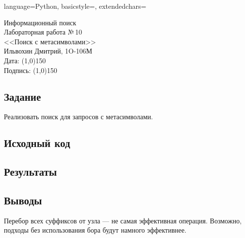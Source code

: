 \documentclass[12pt]{article}
\newcommand{\StudentName}{Ильвохин Дмитрий}
\newcommand{\Group}{1O-106М}
\newcommand{\CourseName}{Информационный поиск}
\newcommand{\LabNum}{10}
\newcommand{\Subject}{Поиск с метасимволами}
\begin{document}
\lstset
{
        language=Python,
        basicstyle=\footnotesize,%
        extendedchars=\true
}

\begin{flushright}
\Large{
	\CourseName \\
	Лабораторная работа №\,\LabNum \\
	<<\Subject>> \\
  \StudentName, \Group \\
  Дата: \line(1,0){150} \\
  Подпись: \line(1,0){150} \\
}
\end{flushright}

\subsection*{Задание}
Реализовать поиск для запросов с метасимволами.

\subsection*{Исходный код}




\subsection*{Результаты}


\subsection*{Выводы}
Перебор всех суффиксов от узла --- не самая эффективная операция.
Возможно, подходы без использования бора будут намного эффективнее.
\end{document}
